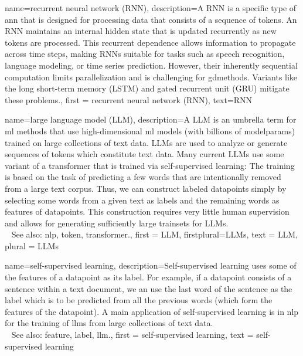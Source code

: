 {name={recurrent neural network (RNN)},
 description={A  RNN 
  is a specific type of \gls{ann} that is designed for processing 
    \gls{data} that consists of a sequence of \glspl{token}. 
	An RNN maintains an internal hidden state that is updated recurrently 
	as new \glspl{token} are processed. This recurrent dependence allows 
	information to propagate across time steps, making RNNs suitable for 
	tasks such as speech recognition, language modeling, or time series prediction. 
    However, their inherently sequential computation limits parallelization and 
	is challenging for \glspl{gdmethod}. Variants like the long short-term memory (LSTM) 
	and gated recurrent unit (GRU) mitigate these problems.}, 
 first = {recurrent neural network (RNN)},
 text={RNN}
}

{name={large language model (LLM)},
 description={A LLM is an umbrella term for \gls{ml} 
               methods that use high-dimensional \gls{ml} \glspl{model} (with billions 
			   of \glspl{modelparam}) trained on large collections of text \gls{data}. 
 			  LLMs are used to analyze or generate sequences of \glspl{token} which 
               constitute text \gls{data}. Many current LLMs use some variant of 
			   a \gls{transformer} that is trained via self-supervised learning:  
			   The training is based on the task of predicting a few words that 
			   are intentionally removed from a large text corpus. Thus, we can 
			   construct \glspl{labeled datapoint} simply by selecting some words 
			   from a given text as \glspl{label} and the remaining words as \glspl{feature} 
			   of \glspl{datapoint}. This construction requires 
		       very little human supervision and allows for generating sufficiently 
		       large \glspl{trainset} for LLMs.\\ 
			   See also: \gls{nlp}, \gls{token}, \gls{transformer}.}, 
  first = {LLM}, 
  firstplural={LLMs}, 
  text = {LLM}, 
  plural = {LLMs} 
}


 {name={self-supervised learning},
  description={Self-supervised learning  uses some of 
  			   the \glspl{feature} of a \gls{datapoint} as its \gls{label}. For 
			   example, if a \gls{datapoint} consists of a sentence within a text document, 
			   we an use the last word of the sentence as the \gls{label} which is 
			   to be predicted from all the previous words (which form the \glspl{feature} 
			   of the \gls{datapoint}). A main application of self-supervised learning 
			   is in \gls{nlp} for the training of \glspl{llm} from large collections 
			   of text \gls{data}. \\ 
      See also: \gls{feature}, \gls{label}, \gls{llm}.}, 
   first = {self-supervised learning}, 
   text = {self-supervised learning}
}




